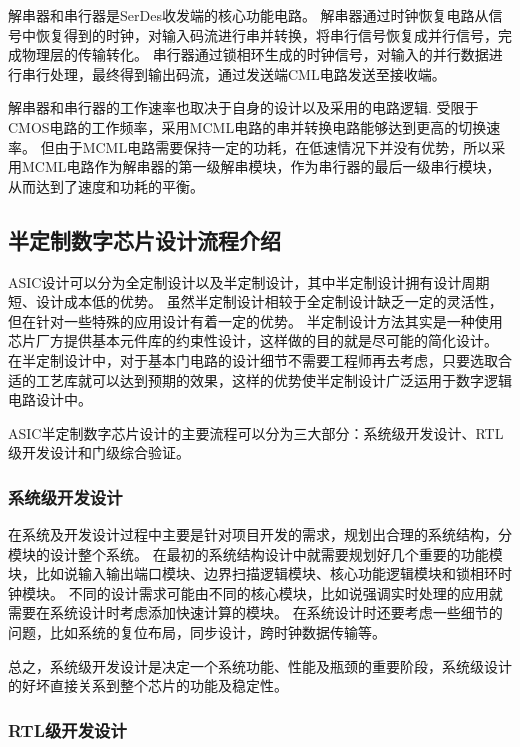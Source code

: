 \documentclass[UTF8]{ctexart}
\begin{document}
解串器和串行器是SerDes收发端的核心功能电路。
解串器通过时钟恢复电路从信号中恢复得到的时钟，对输入码流进行串并转换，将串行信号恢复成并行信号，完成物理层的传输转化。
串行器通过锁相环生成的时钟信号，对输入的并行数据进行串行处理，最终得到输出码流，通过发送端CML电路发送至接收端。

解串器和串行器的工作速率也取决于自身的设计以及采用的电路逻辑.
受限于CMOS电路的工作频率，采用MCML电路的串并转换电路能够达到更高的切换速率。
但由于MCML电路需要保持一定的功耗，在低速情况下并没有优势，所以采用MCML电路作为解串器的第一级解串模块，作为串行器的最后一级串行模块，从而达到了速度和功耗的平衡\cite{tanabe20010}。

\subsection{半定制数字芯片设计流程介绍}

ASIC设计可以分为全定制设计以及半定制设计，其中半定制设计拥有设计周期短、设计成本低的优势。
虽然半定制设计相较于全定制设计缺乏一定的灵活性，但在针对一些特殊的应用设计有着一定的优势。
半定制设计方法其实是一种使用芯片厂方提供基本元件库的约束性设计，这样做的目的就是尽可能的简化设计\cite{yaoyf2006}。
在半定制设计中，对于基本门电路的设计细节不需要工程师再去考虑，只要选取合适的工艺库就可以达到预期的效果，这样的优势使半定制设计广泛运用于数字逻辑电路设计中。

ASIC半定制数字芯片设计的主要流程可以分为三大部分：系统级开发设计、RTL级开发设计和门级综合验证。

\subsubsection{系统级开发设计}

在系统及开发设计过程中主要是针对项目开发的需求，规划出合理的系统结构，分模块的设计整个系统。
在最初的系统结构设计中就需要规划好几个重要的功能模块，比如说输入输出端口模块、边界扫描逻辑模块、核心功能逻辑模块和锁相环时钟模块。
不同的设计需求可能由不同的核心模块，比如说强调实时处理的应用就需要在系统设计时考虑添加快速计算的模块。
在系统设计时还要考虑一些细节的问题，比如系统的复位布局，同步设计，跨时钟数据传输等。

总之，系统级开发设计是决定一个系统功能、性能及瓶颈的重要阶段，系统级设计的好坏直接关系到整个芯片的功能及稳定性。

\subsubsection{RTL级开发设计}
\end{document}
